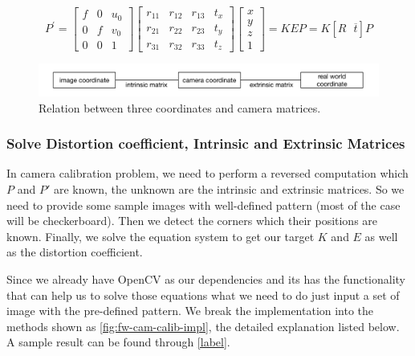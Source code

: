 \begin{equation}
\label{eq:ins-exs-mat}
P^{\prime} = \left[ \begin{array}{ccc}{f} & {0} & {u_{0}} \\ {0} & {f}
& {v_{0}} \\
{0} & {0} & {1}\end{array}\right] \left[ \begin{array}{llll}{r_{11}} & {r_{12}}
& {r_{13}} & {t_{x}} \\ {r_{21}} & {r_{22}} & {r_{23}} & {t_{y}} \\ {r_{31}} &
{r_{32}} & {r_{33}} & {t_{z}}\end{array}\right] \left[ \begin{array}{l}{x} \\
{y} \\ {z} \\ {1}\end{array}\right]
= K E P = K [R \:\:\: \overline{t}] P
\end{equation}

\begin{figure}
    \includegraphics[width=\linewidth]{figures/framework_camera_matrix.png}
    \caption{Relation between three coordinates and camera matrices.}
    \label{fig:fw-ins-exs-mat}
\end{figure}

\subsubsection{Solve Distortion coefficient, Intrinsic and Extrinsic Matrices}

In camera calibration problem, we need to perform a reversed computation which
$P$ and $P'$ are known, the unknown are the intrinsic and extrinsic matrices.
So we need to provide some sample images with well-defined pattern (most of the
case will be checkerboard). Then we detect the corners which their positions are
known. Finally, we solve the equation system to get our target $K$ and $E$ as
well as the distortion coefficient.

Since we already have OpenCV as our dependencies and its has the functionality
that can help us to solve those equations what we need to do just input a set
of image with the pre-defined pattern. We break the implementation into the
methods shown as \autoref{fig:fw-cam-calib-impl}, the detailed explanation
listed below. A sample result can be found through \autoref{label}.

